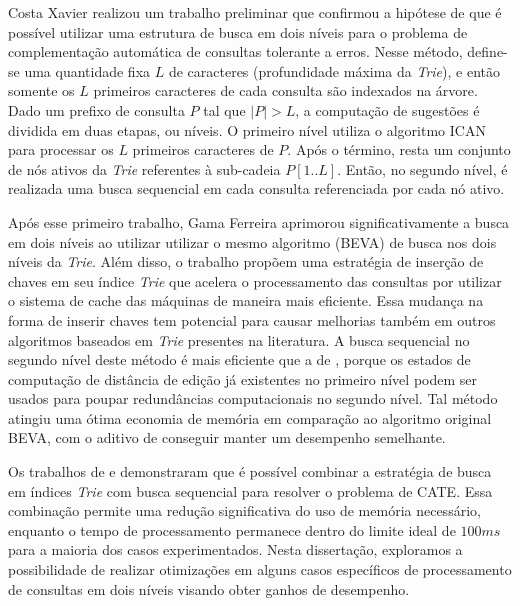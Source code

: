 Costa Xavier \citep{xavier2019} realizou um trabalho preliminar que confirmou a hipótese de que é possível utilizar uma estrutura de busca em dois níveis para o problema de complementação automática de consultas tolerante a erros. Nesse método, define-se uma quantidade fixa $L$ de caracteres (profundidade máxima da \textit{Trie}), e então somente os $L$ primeiros caracteres de cada consulta são indexados na árvore. Dado um prefixo de consulta $P$ tal que $|P| > L$, a computação de sugestões é dividida em duas etapas, ou níveis. O primeiro nível utiliza o algoritmo ICAN \citep{ji2009efficient} para processar os $L$ primeiros caracteres de $P$. Após o término, resta um conjunto de nós ativos da \textit{Trie} referentes à sub-cadeia  $P[1..L]$. Então, no segundo nível, é realizada uma busca sequencial em cada consulta referenciada por cada nó ativo. 

Após esse primeiro trabalho, Gama Ferreira \citep{berg2020} aprimorou significativamente a busca em dois níveis ao utilizar utilizar o mesmo algoritmo (BEVA) de busca nos dois níveis da \textit{Trie}. Além disso, o trabalho propõem uma estratégia de inserção de chaves em seu índice \textit{Trie} que acelera o processamento das consultas por utilizar o sistema de cache das máquinas de maneira mais eficiente. Essa mudança na forma de inserir chaves tem potencial para causar melhorias também em outros algoritmos baseados em \textit{Trie} presentes na literatura. A busca sequencial no segundo nível deste método é mais eficiente que a de \cite{xavier2019}, porque os estados de computação de distância de edição já existentes no primeiro nível podem ser usados para poupar redundâncias computacionais no segundo nível. Tal método atingiu uma ótima economia de memória em comparação ao algoritmo original BEVA, com o aditivo de conseguir manter um desempenho semelhante. 

Os trabalhos de \cite{xavier2019} e \cite{berg2020} demonstraram que é possível combinar a estratégia de busca em índices \textit{Trie} com busca sequencial para resolver o problema de CATE. Essa combinação permite uma redução significativa do uso de memória necessário, enquanto o tempo de processamento permanece dentro do limite ideal de $100ms$ para a maioria dos casos experimentados. Nesta dissertação, exploramos a possibilidade de realizar otimizações em alguns casos específicos de processamento de consultas em dois níveis visando obter ganhos de desempenho.
